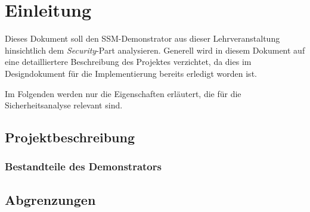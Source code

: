 \clearpage
\section{Einleitung}
\label{sec:stride}
Dieses Dokument soll den SSM-Demonstrator aus dieser Lehrveranstaltung hinsichtlich dem \textit{Security}-Part analysieren. Generell wird in diesem Dokument auf eine detailliertere Beschreibung des Projektes verzichtet, da dies im Designdokument für die Implementierung bereits erledigt worden ist.

Im Folgenden werden nur die Eigenschaften erläutert, die für die Sicherheitsanalyse relevant sind.
\subsection{Projektbeschreibung}
\subsubsection{Bestandteile des Demonstrators}
\subsection{Abgrenzungen}
